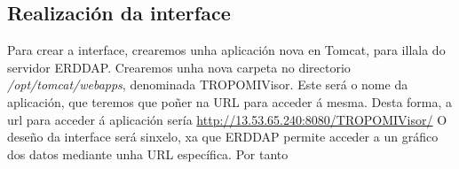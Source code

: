 \subsection{Realización da interface}\label{interface}
Para crear a interface, crearemos unha aplicación nova en Tomcat, para illala do servidor ERDDAP. Crearemos unha nova carpeta no directorio \textit{/opt/tomcat/webapps}, denominada TROPOMIVisor.
Este será o nome da aplicación, que teremos que poñer na URL para acceder á mesma. Desta forma, a url para acceder á aplicación sería \url{http://13.53.65.240:8080/TROPOMIVisor/}
O deseño da interface será sinxelo, xa que ERDDAP permite acceder a un gráfico dos datos mediante unha URL específica. Por tanto
